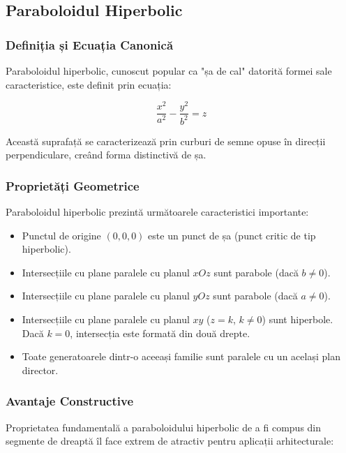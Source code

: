 \documentclass[12pt,a4paper]{article}
\begin{document}
\subsection{Paraboloidul Hiperbolic}

\subsubsection{Definiția și Ecuația Canonică}

Paraboloidul hiperbolic, cunoscut popular ca "șa de cal" datorită formei sale caracteristice, este definit prin ecuația:

\begin{equation}
\frac{x^2}{a^2} - \frac{y^2}{b^2} = z
\end{equation}

Această suprafață se caracterizează prin curburi de semne opuse în direcții perpendiculare, creând forma distinctivă de șa.

\subsubsection{Proprietăți Geometrice}

Paraboloidul hiperbolic prezintă următoarele caracteristici importante:

\begin{itemize}
    \item Punctul de origine $(0,0,0)$ este un punct de șa (punct critic de tip hiperbolic).
    \item Intersecțiile cu plane paralele cu planul $xOz$ sunt parabole (dacă $b \neq 0$).
    \item Intersecțiile cu plane paralele cu planul $yOz$ sunt parabole (dacă $a \neq 0$).
    \item Intersecțiile cu plane paralele cu planul $xy$ ($z=k$, $k \neq 0$) sunt hiperbole. Dacă $k=0$, intersecția este formată din două drepte.
    \item Toate generatoarele dintr-o aceeași familie sunt paralele cu un același plan director.
\end{itemize}

\subsubsection{Avantaje Constructive}

Proprietatea fundamentală a paraboloidului hiperbolic de a fi compus din segmente de dreaptă îl face extrem de atractiv pentru aplicații arhitecturale:
\end{document}
